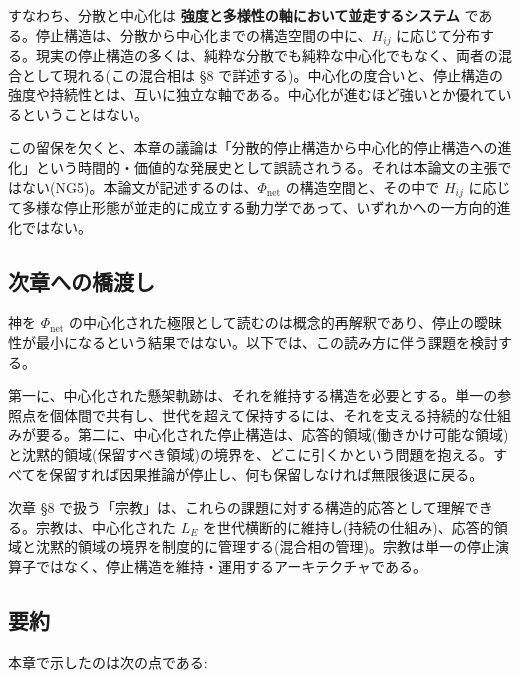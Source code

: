 すなわち、分散と中心化は \textbf{強度と多様性の軸において並走するシステム} である。停止構造は、分散から中心化までの構造空間の中に、$H_{ij}$ に応じて分布する。現実の停止構造の多くは、純粋な分散でも純粋な中心化でもなく、両者の混合として現れる(この混合相は \S{}8 で詳述する)。中心化の度合いと、停止構造の強度や持続性とは、互いに独立な軸である。中心化が進むほど強いとか優れているということはない。

この留保を欠くと、本章の議論は「分散的停止構造から中心化的停止構造への進化」という時間的・価値的な発展史として誤読されうる。それは本論文の主張ではない(NG5)。本論文が記述するのは、$\Phi_{\text{net}}$ の構造空間と、その中で $H_{ij}$ に応じて多様な停止形態が並走的に成立する動力学であって、いずれかへの一方向的進化ではない。

\bigskip


\subsection{次章への橋渡し}


神を $\Phi_{\text{net}}$ の中心化された極限として読むのは概念的再解釈であり、停止の曖昧性が最小になるという結果ではない。以下では、この読み方に伴う課題を検討する。

第一に、中心化された懸架軌跡は、それを維持する構造を必要とする。単一の参照点を個体間で共有し、世代を超えて保持するには、それを支える持続的な仕組みが要る。第二に、中心化された停止構造は、応答的領域(働きかけ可能な領域)と沈黙的領域(保留すべき領域)の境界を、どこに引くかという問題を抱える。すべてを保留すれば因果推論が停止し、何も保留しなければ無限後退に戻る。

次章 \S{}8 で扱う「宗教」は、これらの課題に対する構造的応答として理解できる。宗教は、中心化された $L_E$ を世代横断的に維持し(持続の仕組み)、応答的領域と沈黙的領域の境界を制度的に管理する(混合相の管理)。宗教は単一の停止演算子ではなく、停止構造を維持・運用するアーキテクチャである。

\bigskip


\subsection{要約}


本章で示したのは次の点である:

